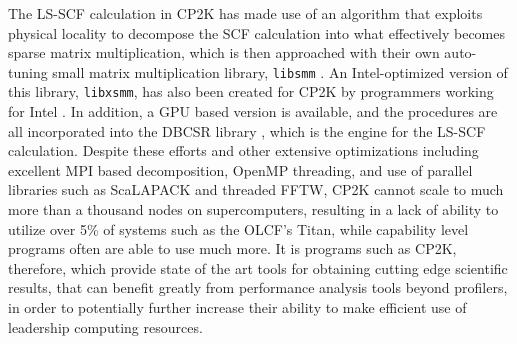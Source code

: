 The \ac{LS-SCF} calculation \cite{vandevondele2012linear} in CP2K has made use of an algorithm that exploits physical locality to decompose the \ac{SCF} calculation into what effectively becomes sparse matrix multiplication, which is then approached with their own auto-tuning small matrix multiplication library, \texttt{libsmm} \cite{borvstnik2014sparse}.
An Intel-optimized version of this library, \texttt{libxsmm}, has also been created for CP2K by programmers working for Intel \cite{heinecke2016libxsmm}.
In addition, a \acs{GPU} based version is available, and the procedures are all incorporated into the \ac{DBCSR} library \cite{borvstnik2014sparse,schutt2016gpu}, which is the engine for the \ac{LS-SCF} calculation.
Despite these efforts and other extensive optimizations including excellent \acs{MPI} based decomposition, OpenMP threading, and use of parallel libraries such as ScaLAPACK and threaded \ac{FFTW}, CP2K cannot scale to much more than a thousand nodes on supercomputers, resulting in a lack of ability to utilize over 5\% of systems such as the \acs{OLCF}'s Titan, while capability level programs often are able to use much more.
It is programs such as CP2K, therefore, which provide state of the art tools for obtaining cutting edge scientific results, that can benefit greatly from performance analysis tools beyond profilers, in order to potentially further increase their ability to make efficient use of leadership computing resources.
